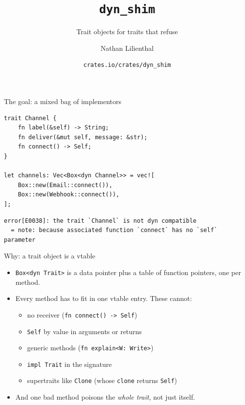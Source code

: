 \documentclass[aspectratio=169]{beamer}
\title{\texttt{dyn\_shim}}
\subtitle{Trait objects for traits that refuse}
\author{Nathan Lilienthal}
\date{\small\texttt{crates.io/crates/dyn\_shim}}
\begin{document}
\begin{frame}
  \titlepage
\end{frame}


\begin{frame}[fragile]{The goal: a mixed bag of implementors}
\begin{lstlisting}
trait Channel {
    fn label(&self) -> String;
    fn deliver(&mut self, message: &str);
    fn connect() -> Self;
}

let channels: Vec<Box<dyn Channel>> = vec![
    Box::new(Email::connect()),
    Box::new(Webhook::connect()),
];
\end{lstlisting}
\pause
\begin{lstlisting}[language={},basicstyle=\ttfamily\footnotesize\color{string}]
error[E0038]: the trait `Channel` is not dyn compatible
  = note: because associated function `connect` has no `self` parameter
\end{lstlisting}
\end{frame}

\begin{frame}{Why: a trait object is a vtable}
  \begin{itemize}
    \item \texttt{Box<dyn Trait>} is a data pointer plus a table of function
          pointers, one per method.
    \item Every method has to fit in one vtable entry. These cannot:
    \begin{itemize}
      \item no receiver (\texttt{fn connect() -> Self})
      \item \texttt{Self} by value in arguments or returns
      \item generic methods (\texttt{fn explain<W: Write>})
      \item \texttt{impl Trait} in the signature
      \item supertraits like \texttt{Clone} (whose \texttt{clone} returns \texttt{Self})
    \end{itemize}
    \item And one bad method poisons the \emph{whole trait}, not just itself.
  \end{itemize}
\end{frame}

\end{document}

